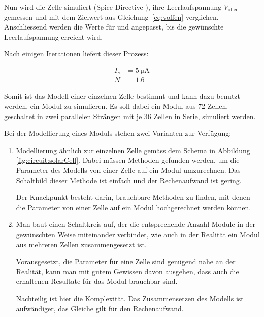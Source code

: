Nun  wird  die  Zelle  simuliert   (Spice  Directive  ),  ihre
Leerlaufspannung  $V_{\mathrm{offen}}$  gemessen  und  mit  dem  Zielwert  aus
Gleichung~\ref{eq:voffen}  verglichen.  Anschliessend  werden die  Werte f\"ur
  und    angepasst,  bis  die  gew\"unschte  Leerlaufspannung
erreicht wird.

Nach einigen Iterationen liefert dieser Prozess\footnotemark:


\begin{align}
    \label{eq:cell:diode:IS:N:result}
    I_s &= \SI{5}{\micro\ampere} \\
    N   &= 1.6
\end{align}

Somit ist  das Modell  einer einzelnen  Zelle bestimmt  und kann  dazu benutzt
werden,  ein Modul  zu  simulieren. Es soll  dabei ein  Modul  aus 72  Zellen,
geschaltet in zwei parallelen Str\"angen mit  je 36 Zellen in Serie, simuliert
werden.

\myfancybreak

Bei der Modellierung eines Moduls stehen zwei Varianten zur Verf\"ugung:

\begin{enumerate}
    \item
        Modellierung  \"ahnlich  zur  einzelnen   Zelle  gem\"ass  dem  Schema
        in  Abbildung   \ref{fig:circuit:solarCell}. Dabei  m\"ussen  Methoden
        gefunden werden, um die Parameter des  Modells von einer Zelle auf ein
        Modul umzurechnen.  Das Schaltbild dieser  Methode ist einfach und der
        Rechenaufwand ist gering.

        Der Knackpunkt besteht darin, brauchbare Methoden zu finden, mit denen
        die  Parameter von  einer  Zelle auf  ein  Modul hochgerechnet  werden
        k\"onnen.
    \item
        Man baut einen Schaltkreis auf, der die entsprechende Anzahl Module in
        der  gew\"unschten  Weise  miteinander  verbindet,  wie  auch  in  der
        Realit\"at ein Modul aus mehreren Zellen zusammengesetzt ist.

        Vorausgesetzt, die Parameter f\"ur eine  Zelle sind gen\"ugend nahe an
        der Realit\"at, kann man mit  gutem Gewissen davon ausgehen, dass auch
        die erhaltenen Resultate f\"ur das Modul brauchbar sind.

        Nachteilig ist hier die  Komplexit\"at. Das Zusammensetzen des Modells
        ist aufw\"andiger, das Gleiche gilt f\"ur den Rechenaufwand.
\end{enumerate}


